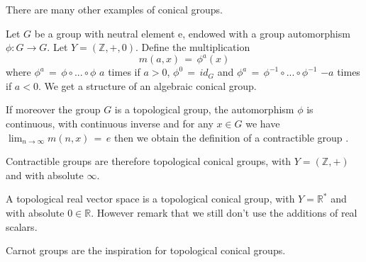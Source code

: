 There are many other examples of conical groups. 

\begin{definition}
Let $G$ be a group with neutral element e,  endowed with a group automorphism $\phi: G \rightarrow G$. Let $\displaystyle Y = (\mathbb{Z}, + , 0)$. Define the multiplication 
$$ m(a,x) \, = \, \phi^{a}(x) $$
where $\displaystyle \phi^{a} \, = \, \phi \circ ... \circ \phi$ $a$ times if $a >0$, $\displaystyle \phi^{0} \, = \, id_{G}$ and  $\displaystyle \phi^{a} \, = \, \phi^{-1} \circ ... \circ \phi^{-1}$  $-a$ times if $a < 0$. We get a structure of an algebraic conical group. 

If moreover the group $G$ is a topological group, the automorphism $\phi$ is continuous, with continuous inverse and for any $x \in G$ we have $\displaystyle \lim_{n \rightarrow \infty} m(n,x) \, = \, e$ then we obtain the definition of a contractible group \cite{siebert}.

\end{definition}

Contractible groups are therefore topological conical groups, with $\displaystyle Y = (\mathbb{Z}, + )$ and with absolute $\infty$. 

A topological real vector space is a topological conical group, with $\displaystyle Y = \mathbb{R}^{*}$ and with absolute $0 \in \mathbb{R}$. However remark that we still don't use the additions of real scalars. 

Carnot groups are the inspiration for topological conical groups. 
